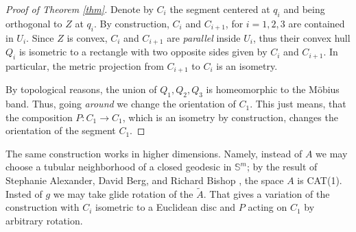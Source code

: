\documentclass[a4paper,10pt]{article}
\begin{document}
\begin{proof}[Proof of Theorem \ref{thm}]
Denote by $C_i$ the segment centered at $q_i$ and being orthogonal to $Z$ at $q_i$.
By construction, $C_i$ and $C_{i+1}$, for $i=1,2,3$   are contained in $U_i$.
Since $Z$ is convex, $C_i$ and $C_{i+1}$ are \emph{parallel} inside $U_i$, thus their convex hull  $Q_i$ is isometric to a rectangle with two opposite sides given by $C_i$ and $C_{i+1}$.
In particular, the metric projection from $C_{i+1}$ to $C_{i}$ is an isometry.

By topological reasons, the union of $Q_1,Q_2,Q_3$ is homeomorphic to the Möbius band.
Thus, going \emph{around} we change the orientation of $C_1$.
This just means, that the composition $P:C_1\to C_1$, which is an isometry by construction, changes the orientation of the segment $C_1$.	
\end{proof}

The same construction works in higher dimensions.
Namely, instead of $A$ we may choose a tubular neighborhood of a closed geodesic in $\mathbb{S}^m$;
by the result of Stephanie Alexander,  David Berg, and Richard Bishop \cite{ABB-1993}, the space $A$ is CAT(1).
Insted of $g$ we may take glide rotation of the $\tilde A$.
That gives a variation of the construction with $C_i$ isometric to a Euclidean disc and $P$ acting on $C_1$ by arbitrary rotation.

{\sloppy
\printbibliography[heading=bibintoc]
\fussy
}
\end{document}
